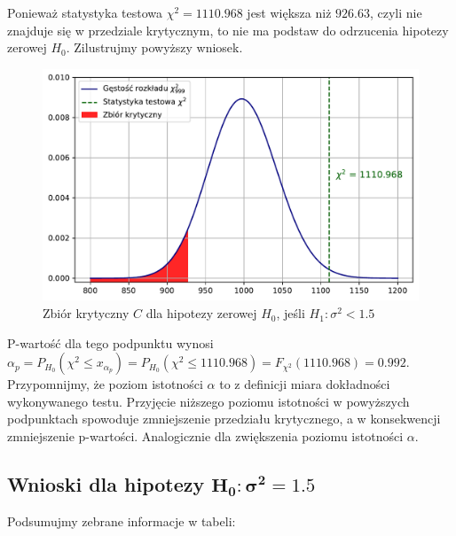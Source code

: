 \documentclass[12pt]{mwart}
\begin{document}
\noindent Ponieważ statystyka testowa $\chi^2=1110.968$ jest większa niż $926.63$, czyli nie znajduje się w przedziale krytycznym, to nie ma podstaw do odrzucenia hipotezy zerowej $H_0$. Zilustrujmy powyższy wniosek.

	\begin{figure}[H]
	\begin{center}
		\includegraphics[scale=0.6]{krytyczny6.pdf}
		\caption{Zbiór krytyczny $C$ dla hipotezy zerowej $H_0$, jeśli $H_1 \colon \sigma^2 < 1.5$}
	\end{center}
	\end{figure}

\noindent P-wartość dla tego podpunktu wynosi $\alpha_p = P_{H_0}(\chi^2 \leq x_{\alpha_p}) = P_{H_0}(\chi^2 \leq 1110.968) = F_{\chi^2} (1110.968) = 0.992$. \\

\noindent Przypomnijmy, że poziom istotności $\alpha$ to z definicji miara dokładności wykonywanego testu. Przyjęcie niższego poziomu istotności w powyższych podpunktach spowoduje zmniejszenie przedziału krytycznego, a w konsekwencji zmniejszenie p-wartości. Analogicznie dla zwiększenia poziomu istotności $\alpha$.


	\subsection{Wnioski dla hipotezy $\bm{H_0 \colon \sigma^2 = 1.5}$}
	\noindent Podsumujmy zebrane informacje w tabeli:
	
	\begin{table}[H]
    \centering
\end{table}
\end{document}
